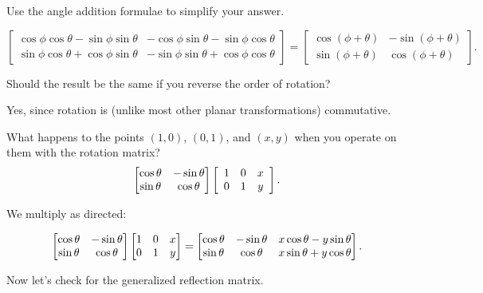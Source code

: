 \documentclass[../gatm_answers.tex]{subfiles}
\begin{document}
\begin{inner_problem}
\item Use the angle addition formulae to simplify your answer.
\end{inner_problem}

$$\begin{bmatrix} \cos\phi\cos\theta - \sin\phi\sin\theta & -\cos\phi\sin\theta-\sin\phi\cos\theta \\ \sin\phi\cos\theta + \cos\phi\sin\theta & -\sin\phi\sin\theta+\cos\phi\cos\theta \end{bmatrix} = \begin{bmatrix} \cos(\phi+\theta) & -\sin(\phi + \theta) \\ \sin(\phi + \theta) & \cos(\phi + \theta)\end{bmatrix}.$$

\begin{inner_problem}
\item Should the result be the same if you reverse the order of rotation?
\end{inner_problem}

Yes, since rotation is (unlike most other planar transformations) commutative.

\begin{inner_problem}
\item What happens to the points $(1,0)$, $(0,1)$, and $(x,y)$ when you operate on them with the rotation matrix? $$\begin{bmatrix} \cos \theta & -\sin \theta \\ \sin\theta & \cos\theta \end{bmatrix}\left[\begin{array}{ccc} 1 & 0 & x \\ 0 & 1 & y \end{array}\right].$$
\end{inner_problem}

We multiply as directed:

$$\begin{bmatrix} \cos \theta & -\sin \theta \\ \sin\theta & \cos\theta \end{bmatrix}\begin{bmatrix} 1 & 0 & x \\ 0 & 1 & y \end{bmatrix} = \begin{bmatrix}\cos \theta & -\sin\theta & x\cos\theta - y\sin\theta \\ \sin\theta & \cos\theta & x\sin\theta + y\cos\theta \end{bmatrix}.$$

\begin{outer_problem}
\item Now let's check for the generalized reflection matrix.
\end{outer_problem}
\end{document}
